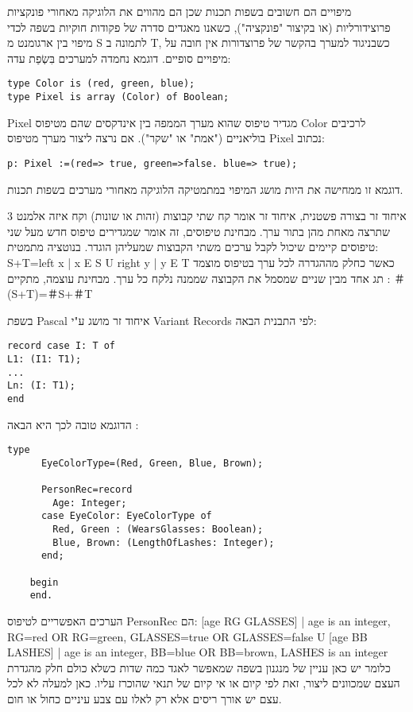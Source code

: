 \begin{טבלא}[!htbp]
      מיפויים הם חשובים בשפות תכנות שכן הם מהווים את הלוגיקה מאחורי פונקציות
      פרוצידורליות (או בקיצור "פונקציה"), כשאנו מאגדים סדרה של פקודות חוקיות בשפה
      לכדי מיפוי בין ארגומנט מ S לתמונה ב T, כשבניגוד למערך בהקשר של פרוצדורות אין
      חובה על מיפויים סופיים. דוגמא נחמדה למערכים בִּשְׂפַת עדה:

\begin{verbatim}
type Color is (red, green, blue);
type Pixel is array (Color) of Boolean;
\end{verbatim}

      Pixel מגדיר טיפוס שהוא מערך הממפה בין אינדקסים שהם מטיפוס Color לרכיבים בוליאניים ("אמת" או "שקר"). אם נרצה ליצור מערך מטיפוס Pixel נכתוב:

\begin{verbatim}
p: Pixel :=(red=> true, green=>false. blue=> true);
\end{verbatim}

      דוגמא זו ממחישה את היות מושג המיפוי במתמטיקה הלוגיקה מאחורי מערכים בשפות תכנות.

      3 איחוד זר
      בצורה פשטנית, איחוד זר אומר קח שתי קבוצות (זהות או שונות) וקח איזה אלמנט שתרצה מאחת מהן בתור ערך. מבחינת טיפוסים, זה אומר שמגדירים טיפוס חדש מעל שני טיפוסים קיימים שיכול לקבל ערכים משתי הקבוצות שמעליהן הוגדר. בנוטציה מתמטית:
      S+T={left x | x E S } U {right y | y E T}
      כאשר כחלק מההגדרה לכל ערך בטיפוס מוצמד תג אחד מבין שניים שמסמל את הקבוצה שממנה נלקח כל ערך.
      מבחינת עוצמה, מתקיים :
      ＃(S+T)=＃S+＃T

      בשפת Pascal איחוד זר מושג ע"י Variant Records לפי התבנית הבאה:
\begin{verbatim}
record case I: T of
L1: (I1: T1);
...
Ln: (I: T1);
end
\end{verbatim}

      הדוגמא טובה לכך היא הבאה :

\begin{verbatim}
type
      EyeColorType=(Red, Green, Blue, Brown);

      PersonRec=record
        Age: Integer;
      case EyeColor: EyeColorType of
        Red, Green : (WearsGlasses: Boolean);
        Blue, Brown: (LengthOfLashes: Integer);
      end;

    begin
    end.
\end{verbatim}

      הערכים האפשריים לטיפוס PersonRec הם:
      { [age RG GLASSES] | age is an integer, RG=red OR RG=green, GLASSES=true OR GLASSES=false} U { [age BB LASHES] | age is an integer, BB=blue OR BB=brown, LASHES is an integer}
      כלומר יש כאן עניין של מנגנון בשפה שמאפשר לאגד כמה שדות כשלא כולם חלק מהגדרת העצם שמכוונים ליצור, זאת לפי קיום או אי קיום של תנאי שהוכרז עליו. כאן למעלה לא לכל עצם יש אורך ריסים אלא רק לאלו עם צבע עיניים כחול או חום.


\end{טבלא}
